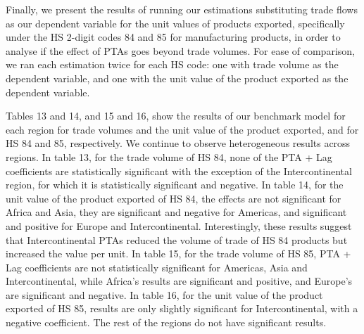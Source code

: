 Finally, we present the results of running our estimations substituting
trade flows as our dependent variable for the unit values of products
exported, specifically under the HS 2-digit codes 84 and 85 for
manufacturing products, in order to analyse if the effect of PTAs goes
beyond trade volumes. For ease of comparison, we ran each estimation
twice for each HS code: one with trade volume as the dependent variable,
and one with the unit value of the product exported as the dependent
variable.

Tables 13 and 14, and 15 and 16, show the results of our benchmark model
for each region for trade volumes and the unit value of the product
exported, and for HS 84 and 85, respectively. We continue to observe
heterogeneous results across regions. In table 13, for the trade volume
of HS 84, none of the PTA + Lag coefficients are statistically
significant with the exception of the Intercontinental region, for which
it is statistically significant and negative. In table 14, for the unit
value of the product exported of HS 84, the effects are not significant
for Africa and Asia, they are significant and negative for Americas, and
significant and positive for Europe and Intercontinental. Interestingly,
these results suggest that Intercontinental PTAs reduced the volume of
trade of HS 84 products but increased the value per unit. In table 15,
for the trade volume of HS 85, PTA + Lag coefficients are not
statistically significant for Americas, Asia and Intercontinental, while
Africa's results are significant and positive, and Europe's are
significant and negative. In table 16, for the unit value of the product
exported of HS 85, results are only slightly significant for
Intercontinental, with a negative coefficient. The rest of the regions
do not have significant results.

